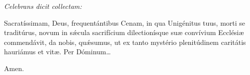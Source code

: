 \textit{Celebrans dicit collectam:}

Sacratíssimam, Deus, frequentántibus Cenam, in qua Unigénitus tuus, morti se traditúrus, novum in sǽcula sacrifícium dilectionísque suæ convívium Ecclésiæ commendávit,
da nobis, quǽsumus, ut ex tanto mystério plenitúdinem caritátis hauriámus et vitæ. Per Dóminum…

\Rbardot{} Amen.
